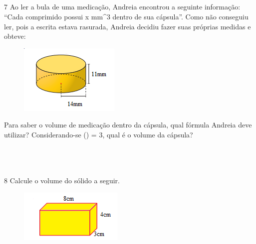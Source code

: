 \\
\\
\\
\\

\num{7} Ao ler a bula de uma medicação, Andreia encontrou a seguinte
informação: ``Cada comprimido possui x mm^3 dentro de sua cápsula''. Como
não conseguiu ler, pois a escrita estava rasurada, Andreia decidiu fazer
suas próprias medidas e obteve:

\begin{figure}[H]
\centering\includegraphics[width=1.88542in,height=1.3125in]{./imgSAEB_8_MAT/media/image50.png}
\end{figure}

Para saber o volume de medicação dentro da cápsula, qual fórmula Andreia deve utilizar?
Considerando-se (\Pi) = 3, qual é o volume da cápsula?

\\
\\
\\

\num{8} Calcule o volume do sólido a seguir.

\begin{figure}[H]
\centering\includegraphics[width=1.94792in,height=0.98958in]{./imgSAEB_8_MAT/media/image51.png}
\end{figure}

\\
\\
\\

